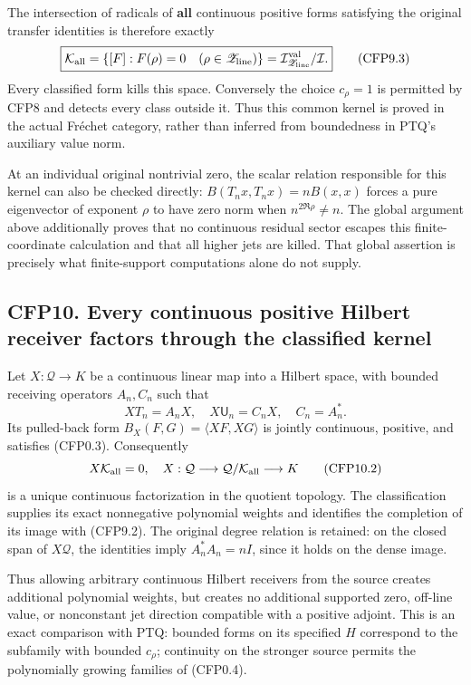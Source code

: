 The intersection of radicals of \textbf{all} continuous positive forms
satisfying the original transfer identities is therefore exactly \[
\boxed{\mathcal K_{\rm all}
=\{[F]:F(\rho)=0\quad(\rho\in\mathscr Z_{\rm line})\}
=\mathcal I_{\mathscr Z_{\rm line}}^{\rm val}/\mathcal I.}
\tag{CFP9.3}
\] Every classified form kills this space. Conversely the choice
\(c_\rho=1\) is permitted by CFP8 and detects every class outside it.
Thus this common kernel is proved in the actual Fréchet category, rather
than inferred from boundedness in PTQ's auxiliary value norm.

At an individual original nontrivial zero, the scalar relation
responsible for this kernel can also be checked directly:
\(B(T_nx,T_nx)=nB(x,x)\) forces a pure eigenvector of exponent \(\rho\)
to have zero norm when \(n^{2\Re\rho}\ne n\). The global argument above
additionally proves that no continuous residual sector escapes this
finite-coordinate calculation and that all higher jets are killed. That
global assertion is precisely what finite-support computations alone do
not supply.

\subsection{CFP10. Every continuous positive Hilbert receiver factors
through the classified
kernel}\label{cfp10.-every-continuous-positive-hilbert-receiver-factors-through-the-classified-kernel}

Let \(X:\mathcal Q\to K\) be a continuous linear map into a Hilbert
space, with bounded receiving operators \(A_n,C_n\) such that \[
XT_n=A_nX,\quad X\mathsf U_n=C_nX,\quad C_n=A_n^*.
\tag{CFP10.1}
\] Its pulled-back form \(B_X(F,G)=\langle XF,XG\rangle\) is jointly
continuous, positive, and satisfies (CFP0.3). Consequently \[
X\mathcal K_{\rm all}=0,
\quad X:\mathcal Q\longrightarrow\mathcal Q/\mathcal K_{\rm all}
\longrightarrow K
\tag{CFP10.2}
\] is a unique continuous factorization in the quotient topology. The
classification supplies its exact nonnegative polynomial weights and
identifies the completion of its image with (CFP9.2). The original
degree relation is retained: on the closed span of \(X\mathcal Q\), the
identities imply \(A_n^*A_n=nI\), since it holds on the dense image.

Thus allowing arbitrary continuous Hilbert receivers from the source
creates additional polynomial weights, but creates no additional
supported zero, off-line value, or nonconstant jet direction compatible
with a positive adjoint. This is an exact comparison with PTQ: bounded
forms on its specified \(H\) correspond to the subfamily with bounded
\(c_\rho\); continuity on the stronger source permits the polynomially
growing families of (CFP0.4).

